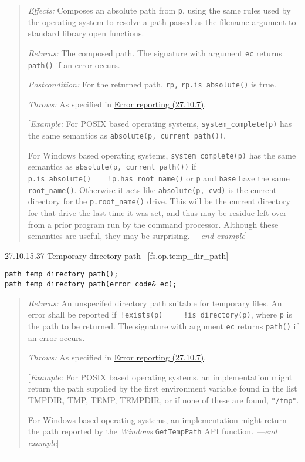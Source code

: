 \begin{quote}
\emph{Effects:} Composes an absolute path from \texttt{p}, using the
same rules used by the operating system to resolve a path passed as the
filename argument to standard library open functions.

\emph{Returns:} The composed path. The signature with argument
\texttt{ec} returns \texttt{path()} if an error occurs.

\emph{Postcondition:} For the returned path, \texttt{rp,}
\texttt{rp.is\_absolute()} is true.

\emph{Throws:} As specified in \hyperref[Error-reporting]{Error
reporting (27.10.7)}.

{[}\emph{Example:} For POSIX based operating systems,
\texttt{system\_complete(p)} has the same semantics as
\texttt{absolute(p,\ current\_path())}.

For Windows based operating systems, \texttt{system\_complete(p)} has
the same semantics as \texttt{absolute(p,\ current\_path())} if
\texttt{p.is\_absolute()\ \textbar{}\textbar{}\ \ \ !p.has\_root\_name()}
or \texttt{p} and \texttt{base} have the same \texttt{root\_name()}.
Otherwise it acts like \texttt{absolute(p,\ cwd)} is the current
directory for the \texttt{p.root\_name()} drive. This will be the
current directory for that drive the last time it was set, and thus may
be residue left over from a prior program run by the command processor.
Although these semantics are useful, they may be surprising.
\emph{---end example}{]}
\end{quote}

27.10.15.37 Temporary directory path~ {[}fs.op.temp\_dir\_path{]}

\begin{verbatim}
path temp_directory_path();
path temp_directory_path(error_code& ec);
\end{verbatim}

\begin{quote}
\emph{Returns:} An unspecifed directory path suitable for temporary
files. An error shall be reported
if\texttt{\ !exists(p)\ \ \ \ \textbar{}\textbar{}\ !is\_directory(p)},
where \texttt{p} is the path to be returned. The signature with argument
\texttt{ec} returns \texttt{path()} if an error occurs.

\emph{Throws:} As specified in \hyperref[Error-reporting]{Error
reporting (27.10.7)}.

{[}\emph{Example:} For POSIX based operating systems, an implementation
might return the path supplied by the first environment variable found
in the list TMPDIR, TMP, TEMP, TEMPDIR, or if none of these are found,
\texttt{"/tmp"}.

For Windows based operating systems, an implementation might return the
path reported by the \emph{Windows} \texttt{GetTempPath} API function.
\emph{---end example}{]}
\end{quote}

\begin{center}\rule{0.5\linewidth}{\linethickness}\end{center}
